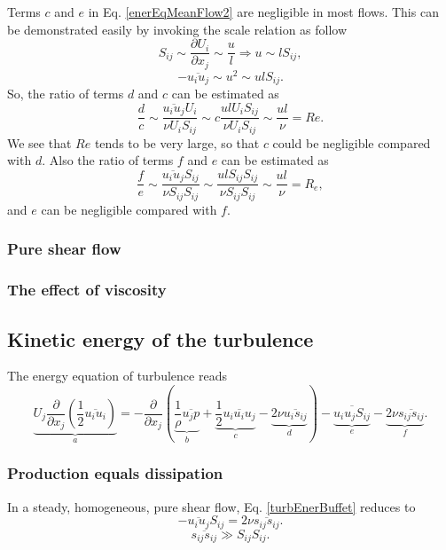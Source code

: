 \documentclass[review]{elsarticle}
\numberwithin{equation}{section}
\begin{document}
		Terms $c$ and $e$ in Eq. \ref{enerEqMeanFlow2} are negligible in most flows. This can be demonstrated easily by invoking 
		the scale relation as follow
		\begin{equation}
			S_{ij} \sim \frac{\partial U_i}{\partial x_j} \sim \frac{u}{l} \Rightarrow u \sim lS_{ij}, 
		\end{equation}
		\begin{equation}
			-\overline{u_iu_j} \sim u^2 \sim ulS_{ij}.
		\end{equation}
		So, the ratio of terms $d$ and $c$ can be estimated as
		\begin{equation}
			\frac{d}{c} \sim \frac{\overline{u_iu_j}U_i}{\nu U_iS_{ij}} \sim c\frac{ulU_iS_{ij}}{\nu U_iS_{ij}} \sim \frac{ul}{\nu}
			= Re.
		\end{equation}
		We see that $Re$ tends to be very large, so that $c$ could be negligible compared with $d$.
		Also the ratio of terms $f$ and $e$ can be estimated as
		\begin{equation}
			\frac{f}{e} \sim \frac{\overline{u_iu_j}S_{ij}}{\nu S_{ij}S_{ij}} \sim \frac{ulS_{ij}S_{ij}}{\nu S_{ij}S_{ij}}
			\sim \frac{ul}{\nu} = R_e, 
		\end{equation} 
		and $e$ can be negligible compared with $f$.
		\subsubsection{Pure shear flow}
		\subsubsection{The effect of viscosity}
	\subsection{Kinetic energy of the turbulence}
		The energy equation of turbulence reads
		\begin{equation}\label{turbEnerBuffet}
			\underbrace {U_j\frac{\partial}{\partial x_j}(\frac{1}{2}\overline{u_iu_i})}_a = -\frac{\partial}{\partial x_j}(
				\underbrace{\frac{1}{\rho}\overline{u_jp}}_b + 
				\underbrace{\frac{1}{2}\overline{u_iu_iu_j}}_c - 
				\underbrace{2\nu \overline{u_is_{ij}}}_d
			) - \underbrace{\overline{u_iu_jS_{ij}}}_e - \underbrace{2\nu \overline{s_{ij}s_{ij}}}_f.
		\end{equation} 
		\subsubsection{Production equals dissipation}
			In a steady, homogeneous, pure shear flow, Eq. \ref{turbEnerBuffet} reduces to
			\begin{equation}
				-\overline{u_iu_j}S_{ij} = 2\nu\overline{s_{ij}s_{ij}}.
			\end{equation}
			\begin{equation}
				\overline{s_{ij}s_{ij}} \gg S_{ij}S_{ij}.
			\end{equation}
\end{document}
